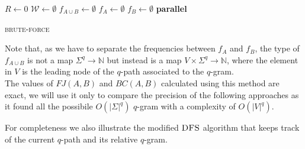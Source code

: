     \begin{algorithm}[h]
    \small
    \DontPrintSemicolon
    \BlankLine
    $R \gets 0$\;
	$\mathcal{W} \gets \emptyset$\;
	$f_{A \cup B} \gets \emptyset$ \quad \;    
	$f_{A} \gets \emptyset$\; 
	$f_{B} \gets \emptyset$\; 
	\BlankLine
    \textbf{parallel} 
	\BlankLine    
	\BlankLine
    \caption{\textsc{brute-force}}
    \label{alg:brute-force}
    \end{algorithm}

	Note that, as we have to separate the frequencies between $f_{A}$ and $f_{B}$, the type of $f_{A \cup B}$ is not a map $ \Sigma^{q} \rightarrow \mathbb{N}$
	but instead is a map $V \times \Sigma^{q} \rightarrow \mathbb{N}$, where the element in $V$ is the leading node of the $q$-path associated to the $q$-gram.\\ 
	
	The values of $FJ(A,B)$ and $BC(A,B)$ calculated using this method are exact, we will use it only to compare the precision of the following approaches as it found all the possibile $O(|\Sigma|^{q})$ $q$-gram with a complexity of $O(|V|^{q})$.\\
	
	\clearpage
	
	For completeness we also illustrate the modified $\textsc{DFS}$ algorithm that keeps track of the current $q$-path and its relative $q$-gram.
	
